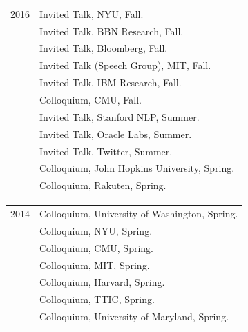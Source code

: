 \documentclass[10pt]{article}
\begin{document}
\hspace{-1cm} \begin{tabular}{lp{11.5cm}}
	2016
	 & \ind   Invited Talk, NYU, Fall.                     \\
	 & \ind   Invited Talk, BBN Research, Fall.            \\
	 & \ind   Invited Talk, Bloomberg, Fall.               \\
	 & \ind   Invited Talk (Speech Group), MIT, Fall.      \\
	 & \ind   Invited Talk, IBM Research, Fall.            \\
	 & \ind   Colloquium, CMU, Fall.                       \\
	 & \ind   Invited Talk, Stanford NLP, Summer.          \\
	 & \ind   Invited Talk, Oracle Labs, Summer.           \\
	 & \ind   Invited Talk, Twitter, Summer.               \\
	 & \ind   Colloquium, John Hopkins University, Spring. \\
	 & \ind   Colloquium, Rakuten, Spring.                 \\
\end{tabular}
\begin{tabular}{lp{11.5cm}}

	2014

	 & \ind   Colloquium, University of Washington, Spring. \\

	 & \ind   Colloquium, NYU, Spring.                      \\

	 & \ind   Colloquium, CMU, Spring.                      \\

	 & \ind   Colloquium, MIT, Spring.                      \\

	 & \ind   Colloquium, Harvard, Spring.                  \\

	 & \ind   Colloquium, TTIC, Spring.                     \\

	 & \ind   Colloquium, University of Maryland, Spring.   \\
\end{tabular}
\end{document}
